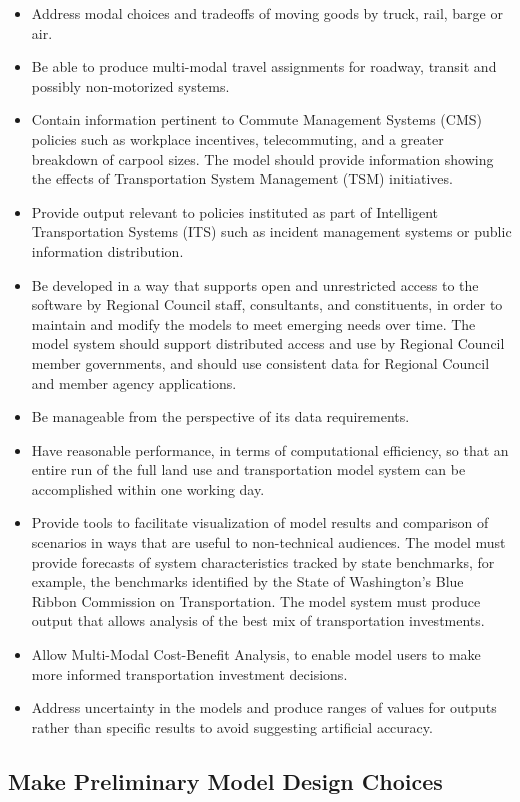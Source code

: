 \begin{itemize}
\item   Address modal choices and tradeoffs of moving goods by truck, rail, barge or air.
\item   Be able to produce multi-modal travel assignments for roadway, transit and possibly non-motorized systems.
\item   Contain information pertinent to Commute Management Systems (CMS) policies such as workplace incentives, telecommuting, and a greater breakdown of carpool sizes.  The model should provide information showing the effects of Transportation System Management (TSM) initiatives.
\item   Provide output relevant to policies instituted as part of Intelligent Transportation Systems (ITS) such as incident management systems or public information distribution.
\item   Be developed in a way that supports open and unrestricted access to the software by Regional Council staff, consultants, and constituents, in order to maintain and modify the models to meet emerging needs over time.  The model system should support distributed access and use by Regional Council member governments, and should use consistent data for Regional Council and member agency applications.
\item   Be manageable from the perspective of its data requirements.
\item   Have reasonable performance, in terms of computational efficiency, so that an entire run of the full land use and transportation model system can be accomplished within one working day.
\item   Provide tools to facilitate visualization of model results and comparison of scenarios in ways that are useful to non-technical audiences.  The model must provide forecasts of system characteristics tracked by state benchmarks, for example, the benchmarks identified by the State of Washington's Blue Ribbon Commission on Transportation.  The model system must produce output that allows analysis of the best mix of transportation investments.
\item   Allow Multi-Modal Cost-Benefit Analysis, to enable model users to make more informed transportation investment decisions.
\item   Address uncertainty in the models and produce ranges of values for outputs rather than specific results to avoid suggesting artificial accuracy.
\end{itemize}

\subsection{Make Preliminary Model Design Choices}

